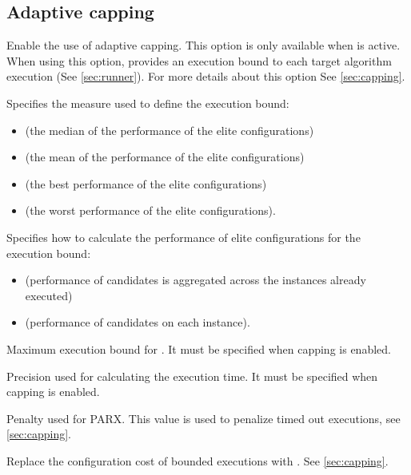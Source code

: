 \subsection[Adaptive capping]{Adaptive capping}
\begin{description}
Enable the use of adaptive capping. This option is only available when  is active. When using this option, \irace provides an execution bound to each target algorithm execution (See \autoref{sec:runner}). For more details about this option See \autoref{sec:capping}.

 Specifies the measure used to define the execution bound:
\begin{itemize}
\item[]  (the median of the performance of the elite configurations)
\item[]  (the mean of the performance of the elite configurations)
\item[]  (the best performance of the elite configurations)
\item[]  (the worst performance of the elite configurations).
\end{itemize}

Specifies how to calculate the performance of elite configurations for the execution bound:
\begin{itemize}
\item[]  (performance of candidates is aggregated across the instances already executed)
\item[]  (performance of candidates on each instance).
\end{itemize}

Maximum execution bound for . It must be specified when capping is enabled.

Precision used for calculating the execution time. It must be specified when capping is enabled.

Penalty used for PARX. This value is used to penalize timed out executions, see \autoref{sec:capping}.

Replace the configuration cost of bounded executions with . See \autoref{sec:capping}.

\end{description}

